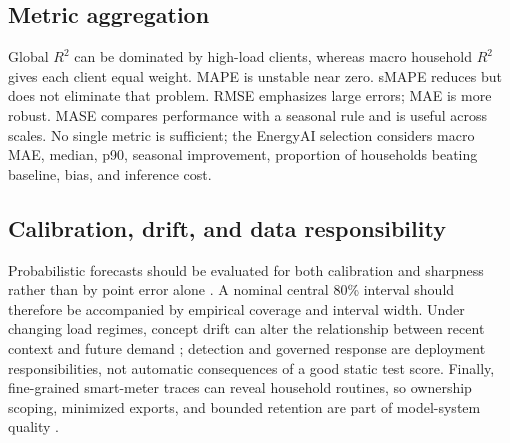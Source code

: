 \subsection{Metric aggregation}

Global $R^2$ can be dominated by high-load clients, whereas macro household $R^2$ gives each client equal weight. MAPE is unstable near zero. sMAPE reduces but does not eliminate that problem. RMSE emphasizes large errors; MAE is more robust. MASE compares performance with a seasonal rule and is useful across scales. No single metric is sufficient; the EnergyAI selection considers macro MAE, median, p90, seasonal improvement, proportion of households beating baseline, bias, and inference cost.

\subsection{Calibration, drift, and data responsibility}

Probabilistic forecasts should be evaluated for both calibration and sharpness rather than by point error alone \cite{gneiting2014probabilistic}. A nominal central 80\% interval should therefore be accompanied by empirical coverage and interval width. Under changing load regimes, concept drift can alter the relationship between recent context and future demand \cite{gama2014drift}; detection and governed response are deployment responsibilities, not automatic consequences of a good static test score. Finally, fine-grained smart-meter traces can reveal household routines, so ownership scoping, minimized exports, and bounded retention are part of model-system quality \cite{molina2010privacy}.

